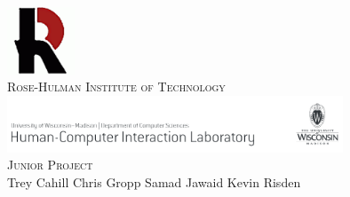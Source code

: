 \documentclass{article}
\begin{document}
\begin{titlepage}
\begin{center}
\includegraphics[width=0.15\textwidth]{rh}\\[1.0cm]
\textsc{\large Rose-Hulman Institute of Technology}\\[1.5cm]
\includegraphics[width=0.75\textwidth]{pss}\\[1.0cm]
\textsc{\large Junior Project}\\[1.0cm]
\large Trey Cahill \hspace{0.2cm} Chris Gropp \hspace{0.2cm} Samad Jawaid \hspace{0.2cm} Kevin Risden
\end{center}
\end{titlepage}
\end{document}
